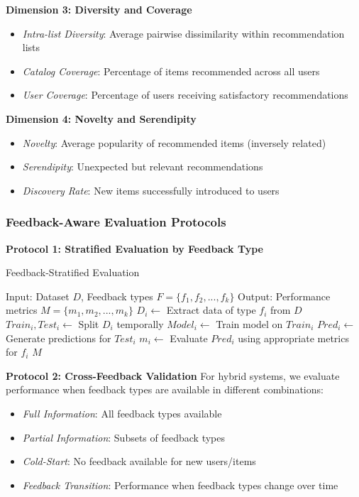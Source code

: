 \textbf{Dimension 3: Diversity and Coverage}
\begin{itemize}
    \item \textit{Intra-list Diversity}: Average pairwise dissimilarity within recommendation lists
    \item \textit{Catalog Coverage}: Percentage of items recommended across all users
    \item \textit{User Coverage}: Percentage of users receiving satisfactory recommendations
\end{itemize}

\textbf{Dimension 4: Novelty and Serendipity}
\begin{itemize}
    \item \textit{Novelty}: Average popularity of recommended items (inversely related)
    \item \textit{Serendipity}: Unexpected but relevant recommendations
    \item \textit{Discovery Rate}: New items successfully introduced to users
\end{itemize}

\subsubsection{Feedback-Aware Evaluation Protocols}

\textbf{Protocol 1: Stratified Evaluation by Feedback Type}
\begin{algorithm}[h]
\caption{Feedback-Stratified Evaluation}
\begin{algorithmic}[1]
\STATE Input: Dataset $D$, Feedback types $F = \{f_1, f_2, ..., f_k\}$
\STATE Output: Performance metrics $M = \{m_1, m_2, ..., m_k\}$
    \STATE $D_i \leftarrow$ Extract data of type $f_i$ from $D$
    \STATE $Train_i, Test_i \leftarrow$ Split $D_i$ temporally
    \STATE $Model_i \leftarrow$ Train model on $Train_i$
    \STATE $Pred_i \leftarrow$ Generate predictions for $Test_i$
    \STATE $m_i \leftarrow$ Evaluate $Pred_i$ using appropriate metrics for $f_i$
\ENDFOR
\RETURN $M$
\end{algorithmic}
\end{algorithm}

\textbf{Protocol 2: Cross-Feedback Validation}
For hybrid systems, we evaluate performance when feedback types are available in different combinations:
\begin{itemize}
    \item \textit{Full Information}: All feedback types available
    \item \textit{Partial Information}: Subsets of feedback types
    \item \textit{Cold-Start}: No feedback available for new users/items
    \item \textit{Feedback Transition}: Performance when feedback types change over time
\end{itemize}

